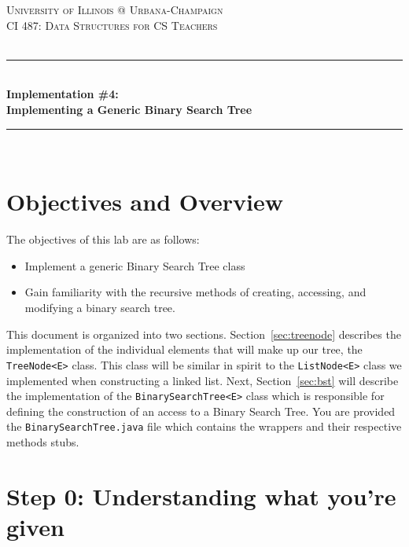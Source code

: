 \documentclass[a4paper]{article}
\begin{document}
\begin{titlepage}

\newcommand{\HRule}{\rule{\linewidth}{0.5mm}} 							%
\center 
 
\textsc{\LARGE University of Illinois @ Urbana-Champaign}\\[1cm]

\textsc{\Large CI 487: Data Structures for CS Teachers}\\[0.2cm]
\textsc{\large }\\[1cm] 										%
\HRule \\[0.8cm]
{ \huge \bfseries Implementation \#4:\\\vspace{0.1cm}Implementing a Generic Binary Search Tree}\\[0.7cm]								%
\HRule \\[0.8cm]
\vfill 
\end{titlepage}

\section{Objectives and Overview}

The objectives of this lab are as follows:
\begin{itemize}
    \item Implement a generic Binary Search Tree class
    \item Gain familiarity with the recursive  methods of creating, accessing, and modifying a binary search tree.
\end{itemize}
This document is organized into two sections. Section~\ref{sec:treenode}
describes the implementation of the individual elements that will make up our
tree, the \lstinline|TreeNode<E>| class. This class will be similar in spirit
to the \lstinline|ListNode<E>| class we implemented when constructing a linked list.
Next, Section~\ref{sec:bst} will describe the implementation of the \lstinline|BinarySearchTree<E>|
class which is responsible for defining the construction of an access to a Binary
Search Tree. You are provided the \lstinline|BinarySearchTree.java| file which contains 
the wrappers and their respective methods stubs.


\section{Step 0: Understanding what you're given} 
\end{document}
